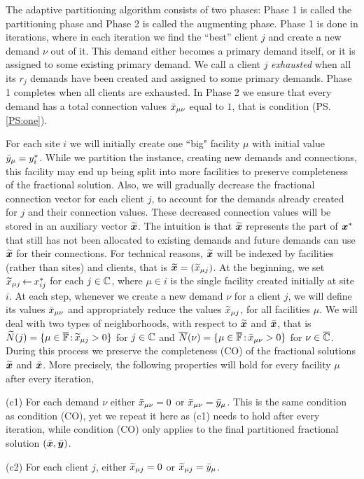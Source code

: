 \documentclass[oneside,final]{ucr}
\begin{document}
The adaptive partitioning algorithm consists of two phases:
Phase 1 is called the partitioning phase and Phase 2 is called
the augmenting phase. Phase 1 is done in iterations, where
in each iteration we find the ``best'' client $j$ and create a
new demand $\nu$ out of it. This demand either becomes a
primary demand itself, or it is assigned to some existing
primary demand. We call a client $j$ \emph{exhausted} when
all its $r_j$ demands have been created and assigned to some
primary demands. Phase 1 completes when all clients are
exhausted. In Phase 2 we ensure that every demand has a
total connection values ${\bar x}_{\mu\nu}$ equal to $1$, that is condition (PS.\ref{PS:one}).

For each site $i$ we will initially create one ``big" facility $\mu$
with initial value ${\bar y}_\mu = y^\ast_i$.  While we partition the
instance, creating new demands and connections, this facility may end
up being split into more facilities to preserve completeness of the
fractional solution. Also, we will gradually decrease the fractional
connection vector for each client $j$, to account for the demands
already created for $j$ and their connection values.  These decreased
connection values will be stored in an auxiliary vector
$\widetilde{\boldsymbol{x}}$. The intuition is that $\widetilde{\boldsymbol{x}}$ represents the part of
$\boldsymbol{x}^\ast$ that still has not been allocated to existing demands and
future demands can use $\widetilde{\boldsymbol{x}}$ for their connections. For
technical reasons, $\widetilde{\boldsymbol{x}}$ will be indexed by facilities (rather
than sites) and clients, that is $\widetilde{\boldsymbol{x}} = ({\widetilde x}_{\mu j})$.  At
the beginning, we set ${\widetilde x}_{\mu j}{\,\leftarrow\,} x_{ij}^\ast$ for each
$j\in\mathbb{C}$, where $\mu\in i$ is the single facility created
initially at site $i$.  At each step, whenever we create a new demand
$\nu$ for a client $j$, we will define its values ${\bar x}_{\mu\nu}$ and
appropriately reduce the values ${\widetilde x}_{\mu j}$, for all facilities
$\mu$. We will deal with two types of neighborhoods, with respect to
$\widetilde{\boldsymbol{x}}$ and $\bar{\boldsymbol{x}}$, that is ${\widetilde N}(j)=\{\mu\in\overline{\mathbb{F}}
{\,:\,}{\widetilde x}_{\mu j} > 0\}$ for $j\in\mathbb{C}$ and
${\overline{N}}(\nu)=\{\mu\in\overline{\mathbb{F}} {\,:\,} {\bar x}_{\mu\nu} >0\}$ for
$\nu\in\overline{\mathbb{C}}$.  During this process we preserve the completeness
(CO) of the fractional solutions $\widetilde{\boldsymbol{x}}$ and $\bar{\boldsymbol{x}}$. More
precisely, the following properties will hold for every facility $\mu$
after every iteration,
%
\begin{description}
	
	\item{(c1)} For each demand $\nu$ either ${\bar x}_{\mu\nu}=0$ or
			${\bar x}_{\mu\nu}={\bar y}_{\mu}$. This is the same
      condition as condition (CO), yet we repeat it here as
      (c1) needs to hold after every iteration, while
      condition (CO) only applies to the final partitioned
      fractional solution $(\bar{\boldsymbol{x}}, \bar{\boldsymbol{y}})$.

	\item{(c2)} For each client $j$,
			either ${\widetilde x}_{\mu j}=0$ or ${\widetilde x}_{\mu j}={\bar y}_{\mu}$.
			
\end{description}
\end{document}
